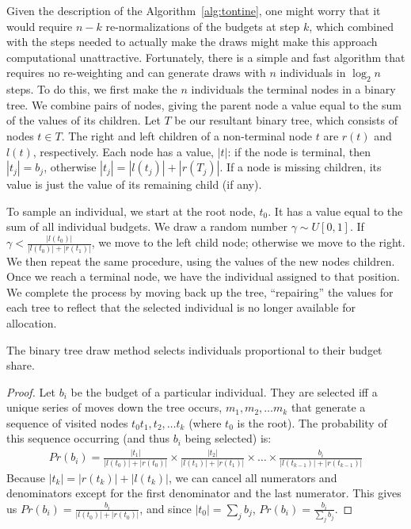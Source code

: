 Given the description of the Algorithm~\ref{alg:tontine}, one might
worry that it would require $n-k$ re-normalizations of the budgets at
step $k$, which combined with the steps needed to actually make the
draws might make this approach computational
unattractive. Fortunately, there is a simple and fast algorithm that
requires no re-weighting and can generate draws with $n$ individuals
in $\log_2 n$ steps. To do this, we first make the $n$ individuals
the terminal nodes in a binary tree. We combine pairs of nodes, giving
the parent node a value equal to the sum of the values of its
children. Let $T$ be our resultant binary tree, which consists of
nodes $t \in T$. The right and left children of a non-terminal node
$t$ are $r(t)$ and $l(t)$, respectively. Each node has a value, $|t|$:
if the node is terminal, then $|t_j| = b_j$, otherwise $|t_j| =
|l(t_j)| + |r(T_j)|$. If a node is missing children, its value is just
the value of its remaining child (if any).

To sample an individual, we start at the root node, $t_0$. It has a
value equal to the sum of all individual budgets. We draw a random
number $\gamma \sim U[0,1]$. If $\gamma < \frac{|l(t_0)|}{|l(t_0)| +
  |r(t_1)|}$, we move to the left child node; otherwise we move to the
right. We then repeat the same procedure, using the values of the new
nodes children. Once we reach a terminal node, we have the individual
assigned to that position. We complete the process by moving back up
the tree, ``repairing'' the values for each tree to reflect that the
selected individual is no longer available for allocation.

\begin{proposition}
The binary tree draw method selects individuals proportional to their
budget share.
\end{proposition} 
\begin{proof}  
Let $b_i$ be the budget of a particular individual. They are selected
iff a unique series of moves down the tree occurs, $m_1,m_2,\ldots
m_k$ that generate a sequence of visited nodes $t_0t_1,t_2,\ldots t_k$
(where $t_0$ is the root). The probability of this sequence occurring
(and thus $b_i$ being selected) is:
\begin{eqnarray*} 
  Pr(b_i) = \frac{|t_1|}{|l(t_0)| + |r(t_0)|} \times
  \frac{|t_2|}{|l(t_1)| + |r(t_1)|} \times \ldots \times
  \frac{b_i}{|l(t_{k-1})| + |r(t_{k-1})|}
\end{eqnarray*} 
Because $|t_k| = |r(t_k)| + |l(t_k)|$, we can cancel all numerators
and denominators except for the first denominator and the last
numerator. This gives us $Pr(b_i) = \frac{b_i}{|l(t_0)| + |r(t_0)|}$,
and since $|t_0| = \sum_j b_j$, $Pr(b_i) = \frac{b_i}{\sum_j b_j}$.
\end{proof} 


